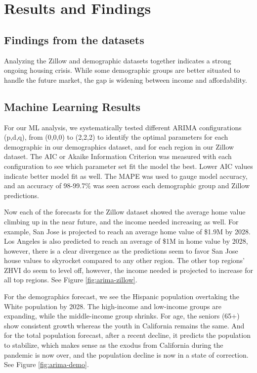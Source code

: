 \documentclass[journal]{IEEEtran}
\begin{document}
\section{Results and Findings}

\subsection{Findings from the datasets}

Analyzing the Zillow and demographic datasets together indicates a strong
ongoing housing crisis. While some demographic groups are better situated to
handle the future market, the gap is widening between income and affordability.

\subsection{Machine Learning Results}

For our ML analysis, we systematically tested different ARIMA configurations
(p,d,q), from (0,0,0) to (2,2,2) to identify the optimal parameters for each
demographic in our demographics dataset, and for each region in our Zillow
dataset. The AIC or Akaike Information Criterion was measured with each
configuration to see which parameter set fit the model the best. Lower AIC
values indicate better model fit as well. The MAPE was used to gauge model
accuracy, and an accuracy of  98-99.7\% was seen across each demographic group
and Zillow predictions.

Now each of the forecasts for the Zillow dataset showed the average home value
climbing up in the near future, and the income needed increasing as well. For
example, San Jose is projected to reach an average home value of \$1.9M by
2028. Los Angeles is also predicted to reach an average of \$1M in home value
by 2028, however, there is a clear divergence as the predictions seem to favor
San Jose house values to skyrocket compared to any other region. The other top
regions’ ZHVI do seem to level off, however, the income needed is projected to
increase for all top regions. See Figure \ref{fig:arima-zillow}.

For the demographics forecast, we see the Hispanic population overtaking the
White population by 2028. The high-income and low-income groups are expanding,
while the middle-income group shrinks. For age, the seniors (65+) show
consistent growth whereas the youth in California remains the same. And for the
total population forecast, after a recent decline, it predicts the population
to stabilize, which makes sense as the exodus from California during the
pandemic is now over, and the population decline is now in a state of
correction. See Figure \ref{fig:arima-demo}.
\end{document}
